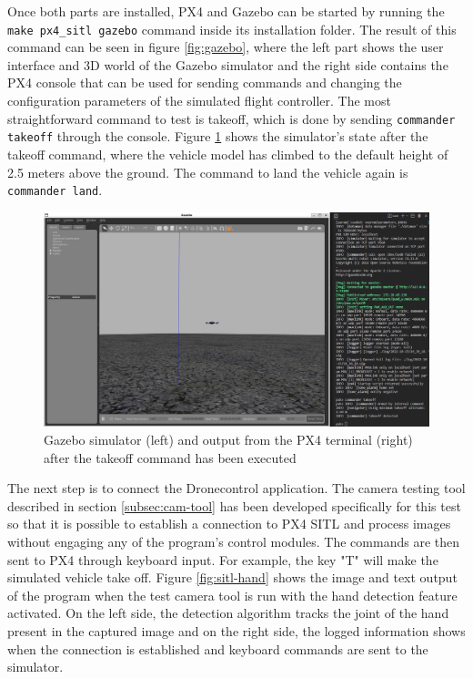Once both parts are installed, PX4 and Gazebo can be started by running the \texttt{make\ px4\_sitl\ gazebo} command inside its installation folder.
The result of this command can be seen in figure \ref{fig:gazebo}, where the left part shows the user interface and 3D world of the Gazebo simulator and the right side contains the PX4 console that can be used for sending commands and changing the configuration parameters of the simulated flight controller.
The most straightforward command to test is takeoff, which is done by sending \texttt{commander takeoff} through the console.
Figure \ref{fig:gazebo-takeoff} shows the simulator's state after the takeoff command, where the vehicle model has climbed to the default height of 2.5 meters above the ground.
The command to land the vehicle again is \texttt{commander land}.

\begin{figure}
  \centering
  \includegraphics[width=\textwidth, keepaspectratio]{img/gazebo-takeoff.png}
  \caption{Gazebo simulator (left) and output from the PX4 terminal (right) after the takeoff command has been executed}\label{fig:gazebo-takeoff}
\end{figure}

The next step is to connect the Dronecontrol application.
The camera testing tool described in section \ref{subsec:cam-tool} has been developed specifically for this test so that it is possible to establish a connection to PX4 SITL and process images without engaging any of the program's control modules.
The commands are then sent to PX4 through keyboard input.
For example, the key "T" will make the simulated vehicle take off.
Figure \ref{fig:sitl-hand} shows the image and text output of the program when the test camera tool is run with the hand detection feature activated.
On the left side, the detection algorithm tracks the joint of the hand present in the captured image and on the right side, the logged information shows when the connection is established and keyboard commands are sent to the simulator.


